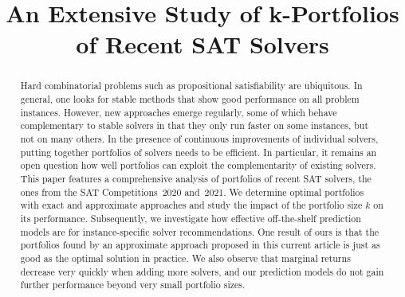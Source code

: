 \documentclass[conference]{IEEEtran}
\begin{document}
\title{An Extensive Study of k-Portfolios\\ of Recent SAT Solvers}

\author{
	\and
	\and
}

\maketitle

\begin{abstract}
Hard combinatorial problems such as propositional satisfiability are ubiquitous. 
In general, one looks for stable methods that show good performance on all problem instances. 
However, new approaches emerge regularly, some of which behave complementary to stable solvers in that they only run faster on some instances, but not on many others. 
In the presence of continuous improvements of individual solvers, putting together portfolios of solvers needs to be efficient. 
In particular, it remains an open question how well portfolios can exploit the complementarity of existing solvers. 
This paper features a comprehensive analysis of portfolios of recent SAT solvers, the ones from the SAT Competitions~2020 and~2021. 
We determine optimal portfolios with exact and approximate approaches and study the impact of the portfolio size $k$ on its performance. 
Subsequently, we investigate how effective off-the-shelf prediction models are for instance-specific solver recommendations.
One result of ours is that the portfolios found by an approximate approach proposed in this current article is just as good as the optimal solution in practice. 
We also observe that marginal returns decrease very quickly when adding more solvers, and our prediction models do not gain further performance beyond very small portfolio sizes. 
\end{abstract}
\end{document}
